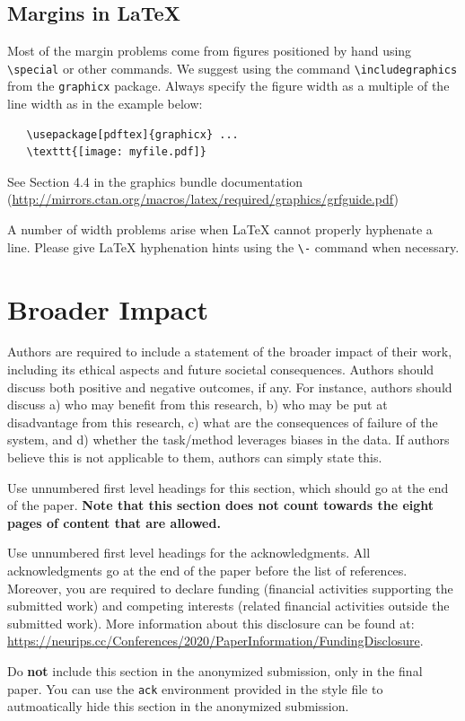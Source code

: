 \documentclass{article}
\begin{document}
\subsection{Margins in \LaTeX{}}

Most of the margin problems come from figures positioned by hand using
\verb+\special+ or other commands. We suggest using the command
\verb+\includegraphics+ from the \verb+graphicx+ package. Always specify the
figure width as a multiple of the line width as in the example below:
\begin{verbatim}
   \usepackage[pdftex]{graphicx} ...
   \texttt{[image: myfile.pdf]}
\end{verbatim}
See Section 4.4 in the graphics bundle documentation
(\url{http://mirrors.ctan.org/macros/latex/required/graphics/grfguide.pdf})

A number of width problems arise when \LaTeX{} cannot properly hyphenate a
line. Please give LaTeX hyphenation hints using the \verb+\-+ command when
necessary.


\section*{Broader Impact}

Authors are required to include a statement of the broader impact of their work, including its ethical aspects and future societal consequences. 
Authors should discuss both positive and negative outcomes, if any. For instance, authors should discuss a) 
who may benefit from this research, b) who may be put at disadvantage from this research, c) what are the consequences of failure of the system, and d) whether the task/method leverages
biases in the data. If authors believe this is not applicable to them, authors can simply state this.

Use unnumbered first level headings for this section, which should go at the end of the paper. {\bf Note that this section does not count towards the eight pages of content that are allowed.}

\begin{ack}
Use unnumbered first level headings for the acknowledgments. All acknowledgments
go at the end of the paper before the list of references. Moreover, you are required to declare 
funding (financial activities supporting the submitted work) and competing interests (related financial activities outside the submitted work). 
More information about this disclosure can be found at: \url{https://neurips.cc/Conferences/2020/PaperInformation/FundingDisclosure}.


Do {\bf not} include this section in the anonymized submission, only in the final paper. You can use the \texttt{ack} environment provided in the style file to autmoatically hide this section in the anonymized submission.
\end{ack}
\end{document}
